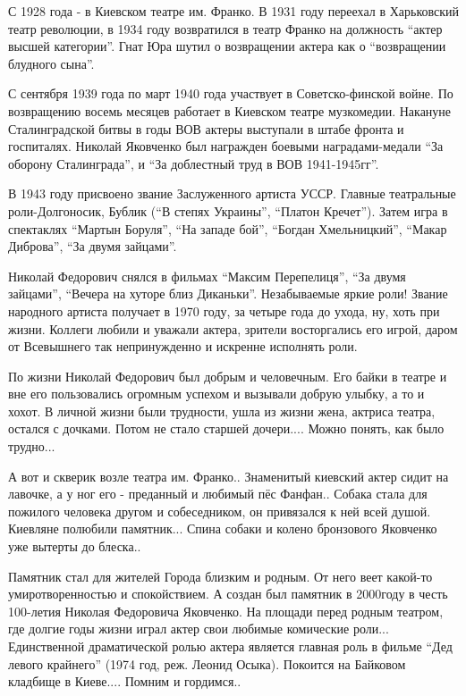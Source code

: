 С 1928 года - в Киевском театре им. Франко. В 1931 году переехал в Харьковский
театр революции, в 1934 году возвратился в театр Франко на должность
\enquote{актер высшей категории}. Гнат Юра шутил о возвращении актера как о
\enquote{возвращении блудного сына}. 

С сентября 1939 года по март 1940 года участвует в Советско-финской войне. По
возвращению восемь месяцев работает в Киевском театре музкомедии. Накануне
Сталинградской битвы  в годы ВОВ актеры выступали в штабе фронта и госпиталях.
Николай Яковченко  был награжден боевыми наградами-медали \enquote{За оборону
Сталинграда}, и \enquote{За доблестный труд в ВОВ 1941-1945гг}. 

В 1943 году присвоено звание Заслуженного артиста УССР. Главные театральные
роли-Долгоносик, Бублик (\enquote{В степях Украины}, \enquote{Платон Кречет}).
Затем игра в спектаклях \enquote{Мартын Боруля}, \enquote{На западе бой},
\enquote{Богдан Хмельницкий}, \enquote{Макар Диброва}, \enquote{За двумя
зайцами}.

Николай Федорович снялся в фильмах \enquote{Максим Перепелиця}, \enquote{За
двумя зайцами}, \enquote{Вечера на хуторе близ Диканьки}. Незабываемые яркие
роли! Звание народного артиста получает в 1970 году, за четыре года до ухода,
ну, хоть при жизни. Коллеги любили и уважали актера, зрители восторгались его
игрой, даром от Всевышнего так непринужденно и искренне исполнять роли. 

По жизни Николай Федорович был добрым и человечным. Его байки в театре и вне
его пользовались огромным успехом и вызывали добрую улыбку, а то и хохот. В
личной жизни были трудности, ушла из жизни жена, актриса театра, остался с
дочками. Потом не стало старшей дочери.... Можно понять, как было трудно... 

А вот и скверик возле театра им. Франко.. Знаменитый киевский актер сидит на
лавочке, а у ног его - преданный и любимый пёс Фанфан.. Собака стала для
пожилого человека другом и собеседником, он привязался к ней всей душой.
Киевляне полюбили памятник... Спина собаки и колено бронзового Яковченко уже
вытерты до блеска.. 

Памятник стал для жителей Города близким и родным. От него веет какой-то
умиротворенностью и спокойствием. А создан был памятник в 2000году в честь
100-летия Николая Федоровича Яковченко. На площади перед родным театром, где
долгие годы жизни играл актер свои любимые комические роли... Единственной
драматической ролью актера является главная роль в фильме \enquote{Дед левого крайнего}
(1974 год, реж. Леонид Осыка). Покоится на Байковом кладбище в Киеве.... Помним
и гордимся..
